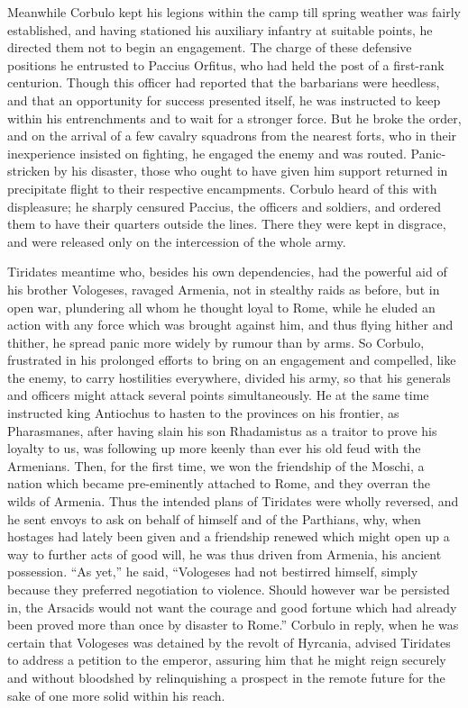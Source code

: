 
Meanwhile Corbulo kept his legions within the camp till spring weather was fairly established, and having stationed his auxiliary infantry at suitable points, he directed them not to begin an engagement. The charge of these defensive positions he entrusted to Paccius Orfitus, who had held the post of a first-rank centurion. Though this officer had reported that the barbarians were heedless, and that an opportunity for success presented itself, he was instructed to keep within his entrenchments and to wait for a stronger force. But he broke the order, and on the arrival of a few cavalry squadrons from the nearest forts, who in their inexperience insisted on fighting, he engaged the enemy and was routed. Panic-stricken by his disaster, those who ought to have given him support returned in precipitate flight to their respective encampments. Corbulo heard of this with displeasure; he sharply censured Paccius, the officers and soldiers, and ordered them to have their quarters outside the lines. There they were kept in disgrace, and were released only on the intercession of the whole army.


Tiridates meantime who, besides his own dependencies, had the powerful aid of his brother Vologeses, ravaged Armenia, not in stealthy raids as before, but in open war, plundering all whom he thought loyal to Rome, while he eluded an action with any force which was brought against him, and thus flying hither and thither, he spread panic more widely by rumour than by arms. So Corbulo, frustrated in his prolonged efforts to bring on an engagement and compelled, like the enemy, to carry hostilities everywhere, divided his army, so that his generals and officers might attack several points simultaneously. He at the same time instructed king Antiochus to hasten to the provinces on his frontier, as Pharasmanes, after having slain his son Rhadamistus as a traitor to prove his loyalty to us, was following up more keenly than ever his old feud with the Armenians. Then, for the first time, we won the friendship of the Moschi, a nation which became pre-eminently attached to Rome, and they overran the wilds of Armenia. Thus the intended plans of Tiridates were wholly reversed, and he sent envoys to ask on behalf of himself and of the Parthians, why, when hostages had lately been given and a friendship renewed which might open up a way to further acts of good will, he was thus driven from Armenia, his ancient possession. ``As yet,'' he said, ``Vologeses had not bestirred himself, simply because they preferred negotiation to violence. Should however war be persisted in, the Arsacids would not want the courage and good fortune which had already been proved more than once by disaster to Rome.'' Corbulo in reply, when he was certain that Vologeses was detained by the revolt of Hyrcania, advised Tiridates to address a petition to the emperor, assuring him that he might reign securely and without bloodshed by relinquishing a prospect in the remote future for the sake of one more solid within his reach.

